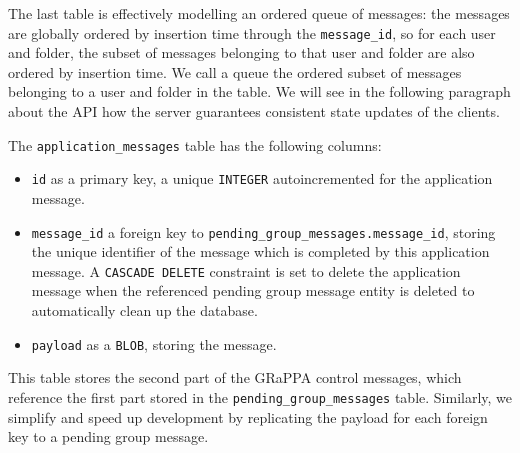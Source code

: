 The last table is effectively modelling an ordered queue of messages:
the messages are globally ordered by insertion time through the \texttt{message\_id},
so for each user and folder, the subset of messages belonging to that
user and folder are also ordered by insertion time.
We call a queue the ordered subset of messages belonging to a user and folder in the table.
We will see in the following paragraph about the API how the server guarantees consistent state updates
of the clients.

The \texttt{application\_messages} table has the following columns:
\begin{itemize}
    \item \texttt{id} as a primary key, a unique \texttt{INTEGER} autoincremented for the application message.
    \item \texttt{message\_id} a foreign key to \texttt{pending\_group\_messages.message\_id}, storing the unique identifier of the message which is completed by this application message. A \texttt{CASCADE DELETE} constraint is set to delete the application message when the referenced pending group message entity is deleted to automatically clean up the database.
    \item \texttt{payload} as a \texttt{BLOB}, storing the message.
\end{itemize}

This table stores the second part of the GRaPPA control messages, which reference 
the first part stored in the \texttt{pending\_group\_messages} table.
Similarly, we simplify and speed up development by replicating the
payload for each foreign key to a pending group message.

